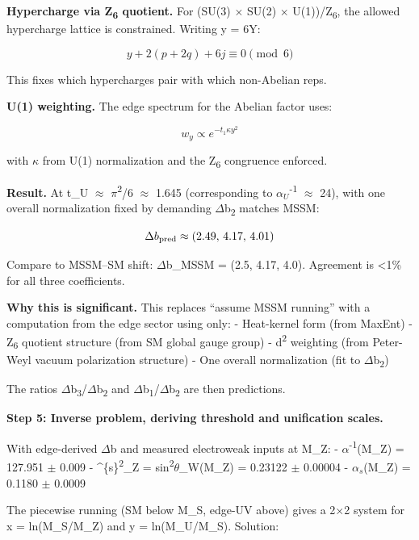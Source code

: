 \documentclass[11pt,a4paper]{article}
\theoremstyle{remark}
\begin{document}
\textbf{Hypercharge via Z\textsubscript{6} quotient.} For (SU(3) \ensuremath{\times} SU(2) \ensuremath{\times} U(1))/Z\textsubscript{6}, the allowed hypercharge lattice is constrained. Writing y = 6Y:

\[
y + 2(p + 2q) + 6j \equiv 0 \pmod{6}
\]

This fixes which hypercharges pair with which non-Abelian reps.

\textbf{U(1) weighting.} The edge spectrum for the Abelian factor uses:

\[
w_y \propto e^{-t_1 \kappa y^2}
\]

with \ensuremath{\kappa} from U(1) normalization and the Z\textsubscript{6} congruence enforced.

\textbf{Result.} At t\_U \ensuremath{\approx} \ensuremath{\pi}\textsuperscript{2}/6 \ensuremath{\approx} 1.645 (corresponding to \(\alpha_U\)\textsuperscript{-1} \ensuremath{\approx} 24), with one overall normalization fixed by demanding \ensuremath{\Delta}b\textsubscript{2} matches MSSM:

\[
\Delta b_{\rm pred} \approx (2.49, \, 4.17, \, 4.01)
\]

Compare to MSSM--SM shift: \ensuremath{\Delta}b\_MSSM = (2.5, 4.17, 4.0). Agreement is \textless1\% for all three coefficients.

\textbf{Why this is significant.} This replaces ``assume MSSM running'' with a computation from the edge sector using only:
- Heat-kernel form (from MaxEnt)
- Z\textsubscript{6} quotient structure (from SM global gauge group)
- d\textsuperscript{2} weighting (from Peter-Weyl vacuum polarization structure)
- One overall normalization (fit to \ensuremath{\Delta}b\textsubscript{2})

The ratios \ensuremath{\Delta}b\textsubscript{3}/\ensuremath{\Delta}b\textsubscript{2} and \ensuremath{\Delta}b\textsubscript{1}/\ensuremath{\Delta}b\textsubscript{2} are then predictions.

\textbf{Step 5: Inverse problem, deriving threshold and unification scales.}

With edge-derived \ensuremath{\Delta}b and measured electroweak inputs at M\_Z:
- \ensuremath{\alpha}\textsuperscript{-1}(M\_Z) = 127.951 \ensuremath{\pm} 0.009
- \^{}\{s\}\textsuperscript{2}\_Z = sin\textsuperscript{2}\ensuremath{\theta}\_W(M\_Z) = 0.23122 \ensuremath{\pm} 0.00004
- \(\alpha_s\)(M\_Z) = 0.1180 \ensuremath{\pm} 0.0009

The piecewise running (SM below M\_S, edge-UV above) gives a 2\ensuremath{\times}2 system for x = ln(M\_S/M\_Z) and y = ln(M\_U/M\_S). Solution:
\end{document}
